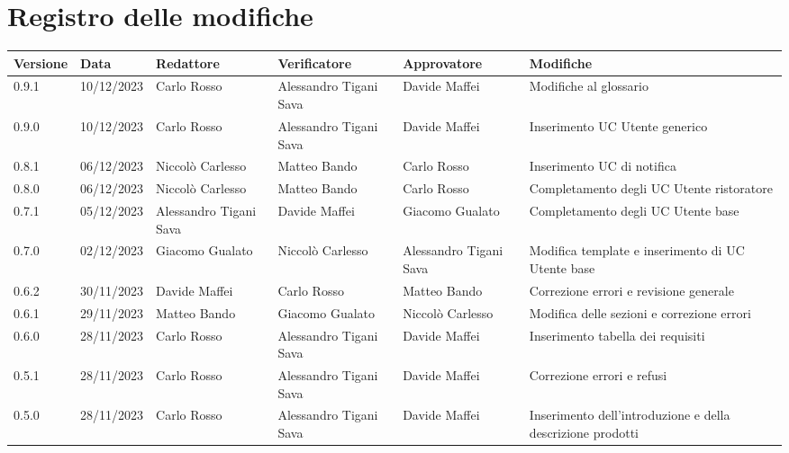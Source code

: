 \section*{Registro delle modifiche}


\begin{table}[H]
	\centering
	\fontsize{10}{12}\selectfont
	\begin{tabularx}{\textwidth}{X|X|X|X|X|X}
		\textbf{Versione}     & \textbf{Data}        & \textbf{Redattore} &
		\textbf{Verificatore} & \textbf{Approvatore} & \textbf{Modifiche}                                      \\
		\toprule
		0.9.1                 & 10/12/2023          & Carlo Rosso   & Alessandro Tigani Sava            & Davide Maffei                 & Modifiche al glossario   \\
		\hline
		0.9.0                 & 10/12/2023          & Carlo Rosso   & Alessandro Tigani Sava            & Davide Maffei                 & Inserimento UC Utente generico   \\
		\hline
		0.8.1                 & 06/12/2023          & Niccolò Carlesso   & Matteo Bando            & Carlo Rosso                 & Inserimento UC di notifica   \\
		\hline
		0.8.0                 & 06/12/2023          & Niccolò Carlesso   & Matteo Bando            & Carlo Rosso                 & Completamento degli UC Utente ristoratore   \\
		\hline
		0.7.1                 & 05/12/2023          & Alessandro Tigani Sava   & Davide Maffei            & Giacomo Gualato                 & Completamento degli UC Utente base   \\
		\hline
		0.7.0                 & 02/12/2023          & Giacomo Gualato   & Niccolò Carlesso             & Alessandro Tigani Sava                 & Modifica template e inserimento di UC Utente base   \\
		\hline
		0.6.2                 & 30/11/2023          & Davide Maffei     & Carlo Rosso             & Matteo Bando                 & Correzione errori e revisione generale    \\
		\hline
		0.6.1                 & 29/11/2023          & Matteo Bando      & Giacomo Gualato         & Niccolò Carlesso                 & Modifica delle sezioni e correzione errori    \\
		\hline
		0.6.0                 & 28/11/2023          & Carlo Rosso   & Alessandro Tigani Sava            & Davide Maffei                 & Inserimento tabella dei requisiti    \\
		\hline
		0.5.1                 & 28/11/2023          & Carlo Rosso   & Alessandro Tigani Sava            & Davide Maffei                 & Correzione errori e refusi    \\
		\hline
		0.5.0                 & 28/11/2023          & Carlo Rosso   & Alessandro Tigani Sava            & Davide Maffei                 & Inserimento dell'introduzione e della descrizione prodotti    \\
		\bottomrule
	\end{tabularx}
\end{table}



